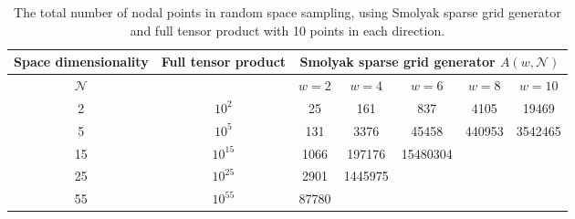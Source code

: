\begin{table}[h]
	\centering
	\caption{\label{Table: number of sparse nodal points} The total number of nodal points in random space sampling, using Smolyak sparse grid generator and full tensor product with 10 points in each direction.}
	\label{my-label}
	\begin{tabular}{|c||c||c cccc}
		\hline
		Space dimensionality & Full tensor product & \multicolumn{5}{c|}{Smolyak sparse grid generator $A(w,\mathcal{N})$} \\ 
		\hline\hline
		$\mathcal{N}$ &  & \multicolumn{1}{c}{$w=2$} & \multicolumn{1}{c}{$w=4$} & \multicolumn{1}{c}{$w=6$} & \multicolumn{1}{c}{$w=8$}  & \multicolumn{1}{c|}{$w=10$}    \\ \hline
		2 & $10^2$ & \multicolumn{1}{c|}{25} & \multicolumn{1}{c|}{161} & \multicolumn{1}{c|}{837} & \multicolumn{1}{c|}{4105} & \multicolumn{1}{c|}{19469}   \\ \hline
		5 & $10^5$ & \multicolumn{1}{c|}{131} & \multicolumn{1}{c|}{3376} & \multicolumn{1}{c|}{45458} & \multicolumn{1}{c|}{440953} & \multicolumn{1}{c|}{3542465} \\ \hline
		15& $10^{15}$ & \multicolumn{1}{c|}{1066} & \multicolumn{1}{c|}{197176} & \multicolumn{1}{c|}{15480304} &  & \\ \cline{1-5}
		25& $10^{25}$ & \multicolumn{1}{c|}{2901} & \multicolumn{1}{c|}{1445975} &  &  &  \\ \cline{1-4}
		55& $10^{55}$ & \multicolumn{1}{c|}{87780} &  &  &   &  \\ \cline{1-3}
	\end{tabular}
\end{table}










